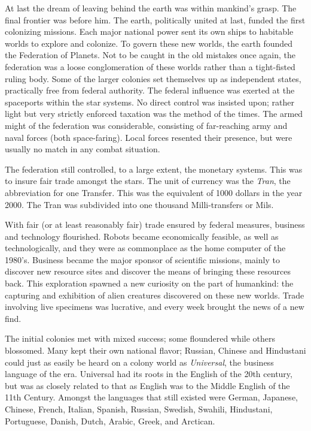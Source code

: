 At last the dream of leaving behind the earth was within mankind's
grasp.  The final frontier was before him.  The earth, politically
united at last, funded the first colonizing missions.  Each major
national power sent its own ships to habitable worlds to explore and
colonize.  To govern these new worlds, the earth founded the
Federation of Planets.  Not to be caught in the old mistakes once
again, the federation was a loose conglomeration of these worlds
rather than a tight-fisted ruling body.  Some of the larger colonies
set themselves up as independent states, practically free from federal
authority.  The federal influence was exerted at the spaceports within
the star systems.  No direct control was insisted upon; rather light
but very strictly enforced taxation was the method of the times.  The
armed might of the federation was considerable, consisting of
far-reaching army and naval forces (both space-faring).  Local forces
resented their presence, but were usually no match in any combat
situation.

The federation still controlled, to a large extent, the monetary
systems.  This was to insure fair trade amongst the stars.  The unit
of currency was the \emph{Tran}, the abbreviation for one Transfer.
This was the equivalent of 1000 dollars in the year
2000.\label{sec:universe-future-change-tran}
The Tran was subdivided into one thousand Milli-transfers or Mils.

With fair (or at least reasonably fair) trade ensured by federal
measures, business and technology flourished.  Robots became
economically feasible, as well as technologically, and they were as
commonplace as the home computer of the 1980's.  Business became the
major sponsor of scientific missions, mainly to discover new resource
sites and discover the means of bringing these resources back.  This
exploration spawned a new curiosity on the part of humankind: the
capturing and exhibition of alien creatures discovered on these new
worlds.  Trade involving live specimens was lucrative, and every week
brought the news of a new find.

The initial colonies met with mixed success; some floundered while
others blossomed.  Many kept their own national flavor; Russian,
Chinese and Hindustani could just as easily be heard on a colony world
as \emph{Universal}, the business language of the era.  Universal had
its roots in the English of the 20th century, but was as closely
related to that as English was to the Middle English of the 11th
Century.  Amongst the languages that still existed were German,
Japanese, Chinese, French, Italian, Spanish, Russian, Swedish,
Swahili,\label{sec:universe-future-change-swahili}
Hindustani, Portuguese, Danish, Dutch, Arabic, Greek, and Arctican.

